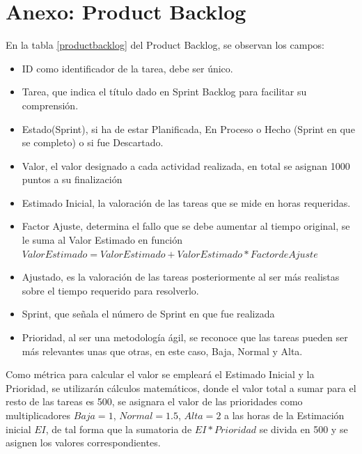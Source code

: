 \section{Anexo: Product Backlog} 
En la tabla \ref{productbacklog} del Product Backlog, se observan los campos:
\begin{itemize}
	\item ID como identificador de la tarea, debe ser único.
	\item Tarea, que indica el título dado en Sprint Backlog para facilitar su comprensión.
	\item Estado(Sprint), si ha de estar Planificada, En Proceso o Hecho (Sprint en que se completo) o si fue Descartado.
	\item Valor, el valor designado a cada actividad realizada, en total se asignan 1000 puntos a su finalización
	\item Estimado Inicial, la valoración de las tareas que se mide en horas requeridas.
	\item Factor Ajuste, determina el fallo que se debe aumentar al tiempo original, se le suma al Valor Estimado en función $Valor Estimado = Valor Estimado + Valor Estimado * Factor de Ajuste$
	\item Ajustado, es la valoración de las tareas posteriormente al ser más realistas sobre el tiempo requerido para resolverlo.
	\item Sprint, que señala el número de Sprint en que fue realizada
	\item Prioridad, al ser una metodología ágil, se reconoce que las tareas pueden ser más relevantes unas que otras, en este caso, Baja, Normal y Alta.	
\end{itemize}

Como métrica para calcular el valor se empleará el Estimado Inicial y la Prioridad, se utilizarán cálculos matemáticos, donde el valor total a sumar para el resto de las tareas es 500, se asignara el valor de las prioridades como multiplicadores $Baja = 1$, $Normal = 1.5$, $Alta = 2$ a las horas de la Estimación inicial $EI$, de tal forma que la sumatoria de $EI*Prioridad$ se divida en 500 y se asignen los valores correspondientes.

